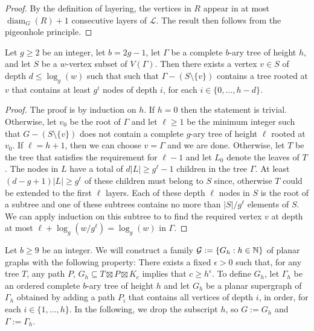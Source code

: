 \documentclass{patmorin}
\DeclareMathOperator{\diam}{diam}
\begin{document}
\begin{proof}
  By the definition of layering, the vertices in $R$ appear in at most $\diam_G(R)+1$ consecutive layers of $\mathcal{L}$. The result then follows from the pigeonhole principle.
\end{proof}


\begin{lem}\label{percolation}
  Let $g\ge 2$ be an integer, let $b=2g-1$, let $\Gamma$ be a complete $b$-ary tree of height $h$, and let $S$ be a $w$-vertex subset of $V(\Gamma)$.  Then there exists a vertex $v\in S$ of depth $d\le\log_g (w)$ such that such that $\Gamma-(S\setminus\{v\})$ contains a tree rooted at $v$ that contains at least $g^i$ nodes of depth $i$, for each $i\in\{0,\ldots,h-d\}$.
\end{lem}

\begin{proof}
  The proof is by induction on $h$.  If $h=0$ then the statement is trivial.  Otherwise, let $v_0$ be the root of $\Gamma$ and let $\ell\ge 1$ be the minimum integer such that $G-(S\setminus\{v\})$ does not contain a complete $g$-ary tree of height $\ell$ rooted at $v_0$.  If $\ell=h+1$, then we can choose $v=\Gamma$ and we are done.  Otherwise, let $T$ be the tree that satisfies the requirement for $\ell-1$ and let $L_0$ denote the leaves of $T$.  The nodes in $L$ have a total of $d|L|\ge g^\ell-1$ children in the tree $\Gamma$.  At least $(d-g+1)|L|\ge g^{\ell}$ of these children must belong to $S$ since, otherwise $T$ could be extended to the first $\ell$ layers.  Each of these depth $\ell$ nodes in $S$ is the root of a subtree and one of these subtrees contains no more than $|S|/g^{\ell}$ elements of $S$. We can apply induction on this subtree to to find the required vertex $v$ at depth at most $\ell+\log_g(w/g^{\ell})=\log_g(w)$ in $\Gamma$.
\end{proof}


Let $b\ge 9$ be an integer.  We will construct a family $\mathcal{G}:=\{G_h:h\in\mathbb{N}\}$ of planar graphs with the following property:  There exists a fixed $\epsilon >0$ such that, for any tree $T$, any path $P$, $G_h\subseteq T\boxtimes P\boxtimes K_c$ implies that $c\ge h^\epsilon$.  To define $G_h$, let $\Gamma_h$ be an ordered complete $b$-ary tree of height $h$ and let $G_h$ be a planar supergraph of $\Gamma_h$ obtained by adding a path $P_i$ that contains all vertices of depth $i$, in order, for each $i\in\{1,\ldots,h\}$.   In the following, we drop the subscript $h$, so $G:=G_h$ and $\Gamma:=\Gamma_h$.
\end{document}
